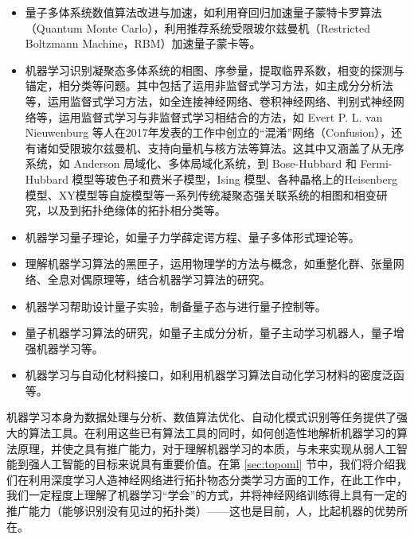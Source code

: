 \begin{itemize}

\item 量子多体系统数值算法改进与加速，如利用脊回归加速量子蒙特卡罗算法（Quantum Monte Carlo）\cite{acmc1,acmc2,acmc3,acmc4}，利用推荐系统受限玻尔兹曼机（Restricted Boltzmann Machine，RBM）加速量子蒙卡\cite{acmcwl1,acmcwl2}等。

\item 机器学习识别凝聚态多体系统的相图、序参量，提取临界系数，相变的探测与锚定，相分类等问题\cite{ml-anderson-2014,confusion,mlphase2017-nphys,wangleipca2016,wcpca,mlphase2017-prx,jp1,jp2,jp3,jp4,zhangyiml2017,zpf2017,wanxin-2017,kernel2017,ml-mbl-2017,pca2017a,pca2017b,rbm-2017,unsup-2017,unsup-hubb-2018,discriminative2018,ml-disorder-2018}。其中包括了运用非监督式学习方法\cite{unsup-2017,unsup-hubb-2018}，如主成分分析法\cite{wangleipca2016,wcpca,pca2017a,pca2017b}等，运用监督式学习方法，如全连接神经网络\cite{zhangyiml2017,mlphase2017-prx,ml-mbl-2017}、卷积神经网络\cite{zpf2017,jp1,jp2,jp3,jp4,mlphase2017-nphys,wanxin-2017}、判别式神经网络\cite{discriminative2018}等，运用监督式学习与非监督式学习相结合的方法，如 Evert P. L. van Nieuwenburg 等人在2017年发表的工作\cite{confusion}中创立的“混淆”网络（Confusion），还有诸如受限玻尔兹曼机\cite{rbm-2017}、支持向量机与核方法\cite{kernel2017}等算法。这其中又涵盖了从无序系统\cite{ml-disorder-2018}，如 Anderson 局域化\cite{ml-anderson-2014,jp1,jp2,jp4}、多体局域化\cite{ml-mbl-2017}系统，到 Bose-Hubbard 和 Fermi-Hubbard 模型等玻色子和费米子模型\cite{confusion,rbm-2017,mlphase2017-prx,pca2017b,unsup-hubb-2018}，Ising 模型\cite{jp3,kernel2017,mlphase2017-nphys,wangleipca2016,wcpca,wanxin-2017}、各种晶格上的Heisenberg 模型、XY模型\cite{pca2017a,unsup-2017,wcpca}等自旋模型等一系列传统凝聚态强关联系统的相图和相变研究，以及到拓扑绝缘体的拓扑相分类\cite{zhangyiml2017,zpf2017,jp1,jp2}等。

\item 机器学习量子理论，如量子力学薛定谔方程\cite{dlshrodinger2017}、量子多体形式理论\cite{ml-manybody}等。

\item 理解机器学习算法的黑匣子\cite{mlanalysis2017lin}，运用物理学的方法与概念，如重整化群\cite{dlrg2013,maprgdl2014,rgml2018}、张量网络、全息对偶原理\cite{yyz2018}等，结合机器学习算法的研究。

\item 机器学习帮助设计量子实验\cite{activelearn-exprdesign-2018}，制备量子态与进行量子控制\cite{rein-2018-prx}等。

\item 量子机器学习算法的研究\cite{qml2017,qai2017}，如量子主成分分析\cite{qpca2014}，量子主动学习机器人\cite{active-agent-2014}，量子增强机器学习\cite{qeml}等。

\item 机器学习与自动化材料接口，如利用机器学习算法自动化学习材料的密度泛函\cite{wcyyz}等。

\end{itemize}


机器学习本身为数据处理与分析、数值算法优化、自动化模式识别等任务提供了强大的算法工具。在利用这些已有算法工具的同时，如何创造性地解析机器学习的算法原理，并使之具有推广能力，对于理解机器学习的本质，与未来实现从弱人工智能到强人工智能的目标来说具有重要价值。在第 \ref{sec:topoml} 节中，我们将介绍我们在利用深度学习人造神经网络进行拓扑物态分类学习方面的工作，在此工作中，我们一定程度上理解了机器学习“学会”的方式，并将神经网络训练得上具有一定的推广能力（能够识别没有见过的拓扑类）——这也是目前，人，比起机器的优势所在。


